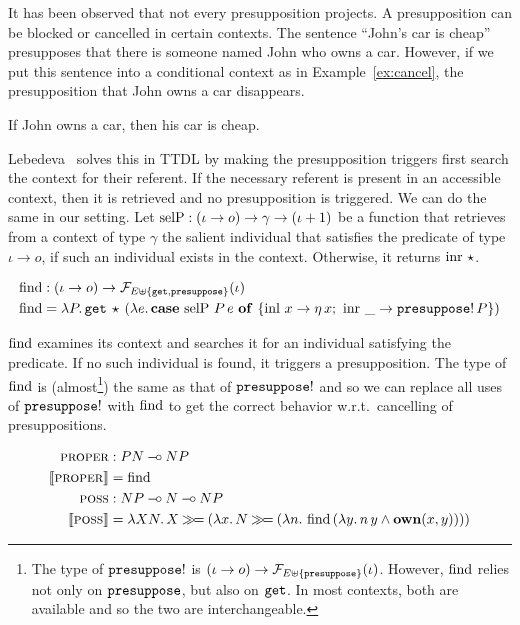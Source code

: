 It has been observed that not every presupposition projects. A
presupposition can be blocked or cancelled in certain contexts. The
sentence ``John's car is cheap'' presupposes that there is someone named
John who owns a car. However, if we put this sentence into a conditional
context as in Example~\ref{ex:cancel}, the presupposition that John owns a
car disappears.

\begin{exe}
  \ex \label{ex:cancel} If John owns a car, then his car is cheap.
\end{exe}

Lebedeva~\cite{lebedeva2012expression} solves this in TTDL by making the
presupposition triggers first search the context for their referent. If the
necessary referent is present in an accessible context, then it is
retrieved and no presupposition is triggered. We can do the same in our
setting. Let $\operatorname{selP} : (\iota \to o) \to \gamma \to (\iota + 1)$ be a
function that retrieves from a context of type $\gamma$ the salient
individual that satisfies the predicate of type $\iota \to o$, if such an
individual exists in the context. Otherwise, it returns $\operatorname{inr}\,\star$.

\begin{align*}
  \operatorname{find} &: (\iota \to o) \to \mathcal{F}_{E \uplus \{\mathtt{get}, \mathtt{presuppose}\}}(\iota) \\
  \operatorname{find} &= \lambda P.\, \mathtt{get}\,\star\,(\lambda e.\, \text{\textbf{case} $\operatorname{selP}\,P\,e$ \textbf{of} $\{ \operatorname{inl}\,x \to \eta\,x;\ \operatorname{inr}\,\_ \to \mathtt{presuppose}!\,P \}$})
\end{align*}

$\operatorname{find}$ examines its context and searches it for an individual satisfying
the predicate. If no such individual is found, it triggers a
presupposition. The type of $\operatorname{find}$ is (almost\footnote{The type of
  $\mathtt{presuppose}!$ is
  $(\iota \to o) \to \mathcal{F}_{E \uplus \{\mathtt{presuppose}\}}(\iota)$. However,
  $\operatorname{find}$ relies not only on $\mathtt{presuppose}$, but also on $\mathtt{get}$. In
  most contexts, both are available and so the two are interchangeable.})
the same as that of $\mathtt{presuppose}!$ and so we can replace all uses of
$\mathtt{presuppose}!$ with $\operatorname{find}$ to get the correct behavior w.r.t.\
cancelling of presuppositions.

\begin{align*}
  \textsc{proper} &: PN \mathbin{{-}\mkern-3.5mu{\circ}} NP \\
  \llbracket \textsc{proper} \rrbracket &= \operatorname{find} \\
  \textsc{poss} &: NP \mathbin{{-}\mkern-3.5mu{\circ}} N \mathbin{{-}\mkern-3.5mu{\circ}} NP \\
  \llbracket \textsc{poss} \rrbracket &= \lambda X N.\, X \mathbin{\gg\!=} (\lambda x.\, N \mathbin{\gg\!=} (\lambda n.\, \operatorname{find}\,(\lambda y.\, n\,y \land \textbf{own}(x, y))))
\end{align*}

